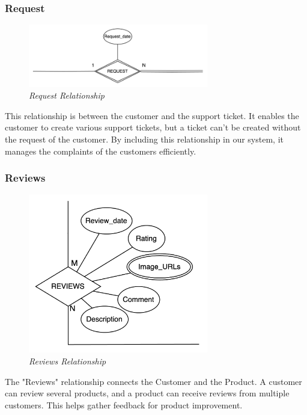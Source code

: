 \subsubsection{Request}
\begin{figure}[H]
  \centering
  \includegraphics[width=0.7\textwidth]{images/relationships/request.png}
  \caption{\textit{Request Relationship}}
\end{figure}

This relationship is between the customer and the support ticket. It enables the customer to create various support tickets, but a ticket can't be created without the request of the customer. By including this relationship in our system, it manages the complaints of the customers efficiently.

\subsubsection{Reviews}
\begin{figure}[H]
  \centering
  \includegraphics[width=0.7\textwidth]{images/relationships/reviews.png}
  \caption{\textit{Reviews Relationship}}
\end{figure}

The "Reviews" relationship connects the Customer and the Product. A customer can review several products, and a product can receive reviews from multiple customers. This helps gather feedback for product improvement.

